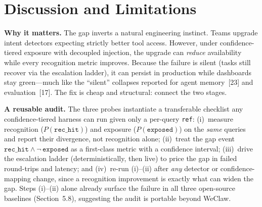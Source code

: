 \section{Discussion and Limitations}
\label{sec:discussion}

\textbf{Why it matters.} The gap inverts a natural engineering instinct. Teams upgrade intent detectors expecting strictly better tool access. However, under confidence-tiered exposure with decoupled injection, the upgrade can \emph{reduce} availability while every recognition metric improves. Because the failure is silent (tasks still recover via the escalation ladder), it can persist in production while dashboards stay green---much like the ``silent'' collapses reported for agent memory~[23] and evaluation~[17]. The fix is cheap and structural: connect the two stages.

\textbf{A reusable audit.} The three probes instantiate a transferable checklist any confidence-tiered harness can run given only a per-query \texttt{ref}: (i)~measure recognition ($P(\texttt{rec\_hit})$) and exposure ($P(\texttt{exposed})$) on the \emph{same} queries and report their divergence, not recognition alone; (ii)~treat the gap event $\texttt{rec\_hit}\wedge\neg\,\texttt{exposed}$ as a first-class metric with a confidence interval; (iii)~drive the escalation ladder (deterministically, then live) to price the gap in failed round-trips and latency; and (iv)~re-run (i)--(ii) after \emph{any} detector or confidence-mapping change, since a recognition improvement is exactly what can widen the gap. Steps (i)--(ii) alone already surface the failure in all three open-source baselines (Section~5.8), suggesting the audit is portable beyond WeClaw.

